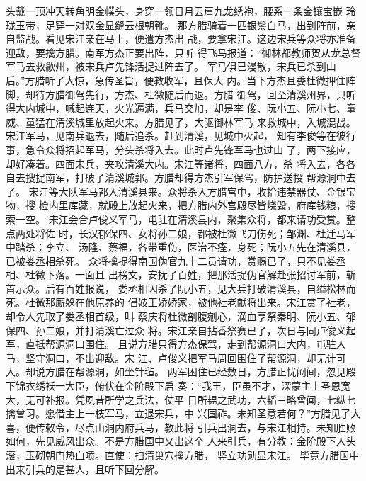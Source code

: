 头戴一顶冲天转角明金幞头，身穿一领日月云肩九龙绣袍，腰系一条金镶宝嵌
玲珑玉带，足穿一对双金显缝云根朝靴。
那方腊骑着一匹银鬃白马，出到阵前，亲自监战。看见宋江亲在马上，便遣方杰出
战，要拿宋江。这边宋兵等众将亦准备迎敌，要擒方腊。南军方杰正要出阵，只听
得飞马报道：“御林都教师贺从龙总督军马去救歙州，被宋兵卢先锋活捉过阵去了。
军马俱已漫散，宋兵已杀到山后。”方腊听了大惊，急传圣旨，便教收军，且保大
内。当下方杰且委杜微押住阵脚，却待方腊御驾先行，方杰、杜微随后而退。方腊
御驾，回至清溪州界，只听得大内城中，喊起连天，火光遍满，兵马交加，却是李
俊、阮小五、阮小七、童威、童猛在清溪城里放起火来。方腊见了，大驱御林军马
来救城中，入城混战。宋江军马，见南兵退去，随后追杀。赶到清溪，见城中火起，
知有李俊等在彼行事，急令众将招起军马，分头杀将入去。此时卢先锋军马也过山
了，两下接应，却好凑着。四面宋兵，夹攻清溪大内。宋江等诸将，四面八方，杀
将入去，各各自去搜捉南军，打破了清溪城郭。方腊却得方杰引军保驾，防护送投
帮源洞中去了。
宋江等大队军马都入清溪县来。众将杀入方腊宫中，收拾违禁器仗、金银宝物，搜
检内里库藏，就殿上放起火来，把方腊内外宫殿尽皆烧毁，府库钱粮，搜索一空。
宋江会合卢俊义军马，屯驻在清溪县内，聚集众将，都来请功受赏。整点两处将佐
时，长汉郁保四、女将孙二娘，都被杜微飞刀伤死；邹渊、杜迁马军中踏杀；李立、
汤隆、蔡福，各带重伤，医治不痊，身死；阮小五先在清溪县，已被娄丞相杀死。
众将擒捉得南国伪官九十二员请功，赏赐已了，只不见娄丞相、杜微下落。一面且
出榜文，安抚了百姓，把那活捉伪官解赴张招讨军前，斩首示众。后有百姓报说，
娄丞相因杀了阮小五，见大兵打破清溪县，自缢松林而死。杜微那厮躲在他原养的
倡妓王娇娇家，被他社老献将出来。宋江赏了社老，却令人先取了娄丞相首级，叫
蔡庆将杜微剖腹剜心，滴血享祭秦明、阮小五、郁保四、孙二娘，并打清溪亡过众
将。宋江亲自拈香祭赛已了，次日与同卢俊义起军，直抵帮源洞口围住。
且说方腊只得方杰保驾，走到帮源洞口大内，屯驻人马，坚守洞口，不出迎敌。宋
江、卢俊义把军马周回围住了帮源洞，却无计可入。却说方腊在帮源洞，如坐针毡。
两军困住已经数日，方腊正忧闷间，忽见殿下锦衣绣袄一大臣，俯伏在金阶殿下启
奏：“我王，臣虽不才，深蒙主上圣恩宽大，无可补报。凭夙昔所学之兵法，仗平
日所韫之武功，六韬三略曾闻，七纵七擒曾习。愿借主上一枝军马，立退宋兵，中
兴国祚。未知圣意若何？”方腊见了大喜，便传敕令，尽点山洞内府兵马，教此将
引兵出洞去，与宋江相持。未知胜败如何，先见威风出众。不是方腊国中又出这个
人来引兵，有分教：金阶殿下人头滚，玉砌朝门热血喷。直使：扫清巢穴擒方腊，
竖立功勋显宋江。
毕竟方腊国中出来引兵的是甚人，且听下回分解。